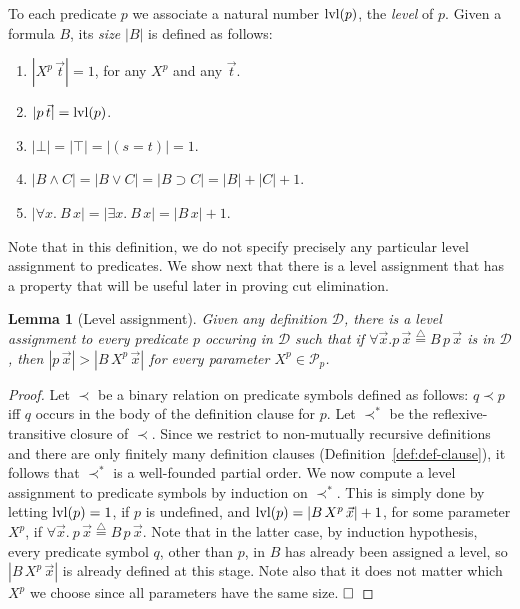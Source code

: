 \documentclass[preprint]{elsarticle}
\def\Dscr{{\mathcal D}}
\def\Pscr{{\mathcal P}}
\newcommand{\defeq}{\stackrel{\scriptscriptstyle\triangle}{=}}
\newcommand{\level}[1]{{\rm lvl}(#1)}
\newcommand{\oimp}{\supset}
\newtheorem{lemma}[thm]{Lemma}
\def\qed{$\hfill\Box$}
\begin{document}
\begin{definition}
  \label{def:level}
  To each predicate $p$ we associate a natural number $\level{p}$, the
  \emph{level} of $p$.  Given a formula $B$, its \emph{size} $|B|$ is
  defined as follows:
  \begin{enumerate}
  \item $|X^p\,\vec t| = 1$, for any $X^p$ and any $\vec t$. 
  \item $|p \, \vec{t}| = \level{p}$. 
  \item $|\bot| = |\top| = |(s = t)| = 1$. 
  \item $|B \land C| = |B \lor C| = |B \oimp C| = |B| + |C| + 1$. 
  \item $|\forall x.\ B\,x| = |\exists x.\ B\,x| = |B\,x| + 1$. 
  \end{enumerate}
\end{definition}


Note that in this definition, we do not specify precisely
any particular level assignment to predicates. We show next that
there is a level assignment that has a property that will be useful
later in proving cut elimination. 

\begin{lemma}[Level assignment]
\label{lm:level}
Given any definition $\Dscr$, there is a level assignment
to every predicate $p$ occuring in $\Dscr$ such that
if $\forall \vec x. p\,\vec x \defeq B\,p\,\vec x$ is in $\Dscr$,
then $|p\,\vec x| >  |B\,X^p\,\vec x|$ for every parameter $X^p \in \Pscr_p$. 
\end{lemma}
\begin{proof}
  Let $\prec$ be a binary relation on predicate symbols defined as
  follows: $ q \prec p $ iff $q$ occurs in the body of the definition
  clause for $p$. Let $\prec^*$ be the reflexive-transitive closure of
  $\prec$.  Since we restrict to non-mutually recursive definitions
  and there are only finitely many definition clauses
  (Definition~\ref{def:def-clause}), it follows that $\prec^*$ is a
  well-founded partial order.  We now compute a level assignment to
  predicate symbols by induction on $\prec^*$. This is simply done by
  letting $\level p = 1$, if $p$ is undefined, and $\level p =
  |B\,X^p\,\vec x| + 1$, for some parameter $X^p$, if $\forall \vec
  x.\ p\,\vec x \defeq B\,p\,\vec x.$ Note that in the latter case, by
  induction hypothesis, every predicate symbol $q$, other than $p$, in
  $B$ has already been assigned a level, so $|B\,X^p\,\vec x|$ is
  already defined at this stage.  Note also that it does not matter
  which $X^p$ we choose since all parameters have the same size.  \qed
\end{proof}
\end{document}
